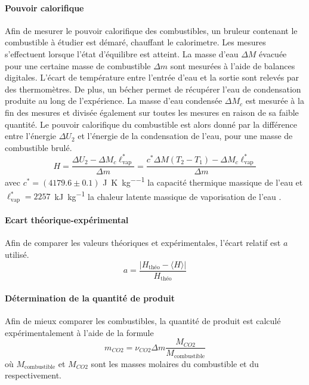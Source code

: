 \paragraph*{Pouvoir calorifique}
Afin de mesurer le pouvoir calorifique des combustibles, un bruleur contenant le combustible à étudier est démaré, chauffant le calorimetre. Les mesures s'effectuent lorsque l'état d'équilibre est atteint. La masse d'eau \(\Delta M\) évacuée pour une certaine masse de combustible \(\Delta m\) sont mesurées à l'aide de balances digitales. L'écart de température entre l'entrée d'eau et la sortie sont relevés par des thermomètres. De plus, un bécher permet de récupérer l'eau de condensation produite au long de l'expérience. La masse d'eau condensée \(\Delta M_c\) est mesurée à la fin des mesures et divisée également sur toutes les mesures en raison de sa faible quantité. Le pouvoir calorifique du combustible est alors donné par la différence entre l'énergie \(\Delta U_2\) et l'énergie de la condensation de l'eau, pour une masse de combustible brulé.
\begin{equation}
    H = \frac{\Delta U_2 - \Delta M_c \ell_\textrm{vap}^*}{\Delta m} = \frac{c^* \Delta M (T_2 - T_1) - \Delta M_c \ell_\textrm{vap}^*}{\Delta m}
    \label{eq:pouvoir_calorifique}
\end{equation}
avec \(c^* = (4179.6 \pm 0.1)\) \si{\joule\per\kelvin\per\kilo\gram} la capacité thermique massique de l'eau \cite{capacite-eau} et \mbox{\(\ell_\textrm{vap}^* = 2257\) \si{\kilo\joule\per\kilo\gram}} la chaleur latente massique de vaporisation de l'eau \cite{notice}.

\paragraph*{Ecart théorique-expérimental}
Afin de comparer les valeurs théoriques et expérimentales, l'écart relatif est \(a\) utilisé.
\begin{equation}
    a = \frac{ |H_\textrm{théo} - \langle H \rangle| }{ H_\textrm{théo} }
    \label{eq:ecart_rel}
\end{equation}

\paragraph*{Détermination de la quantité de  produit}
Afin de mieux comparer les combustibles, la quantité de  produit est calculé expérimentalement à l'aide de la formule
\begin{equation}
    m_{CO2} = \nu_{CO2} \Delta m \frac{M_{CO2}}{M_\textrm{combustible}}
\end{equation}
où \(M_\textrm{combustible}\) et \(M_{CO2}\) sont les masses molaires du combustible et du  respectivement.
